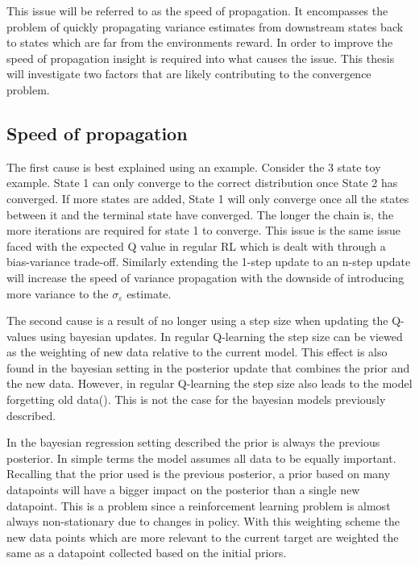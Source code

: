 This issue will be referred to as the speed of propagation. It encompasses the problem of quickly propagating variance estimates from downstream states back to states which are far from the environments reward. In order to improve the speed of propagation insight is required into what causes the issue. This thesis will investigate two factors that are likely contributing to the convergence problem.

\subsection{Speed of propagation}

The first cause is best explained using an example. Consider the 3 state toy example. State 1 can only converge to the correct distribution once State 2 has converged. If more states are added, State 1 will only converge once all the states between it and the terminal state have converged. The longer the chain is, the more iterations are required for state 1 to converge. This issue is the same issue faced with the expected Q value in regular RL which is dealt with through a bias-variance trade-off. Similarly extending the 1-step update to an n-step update will increase the speed of variance propagation with the downside of introducing more variance to the $\sigma_\varepsilon$ estimate.

The second cause is a result of no longer using a step size when updating the Q-values using bayesian updates. In regular Q-learning the step size can be viewed as the weighting of new data relative to the current model. This effect is also found in the bayesian setting in the posterior update that combines the prior and the new data. However, in regular Q-learning the step size also leads to the model forgetting old data(\citep[p~.229]{sutton_barto_2018}). This is not the case for the bayesian models previously described.

In the bayesian regression setting described the prior is always the previous posterior. In simple terms the model assumes all data to be equally important. Recalling that the prior used is the previous posterior, a prior based on many datapoints will have a bigger impact on the posterior than a single new datapoint. This is a problem since a reinforcement learning problem is almost always non-stationary due to changes in policy. With this weighting scheme the new data points which are more relevant to the current target are weighted the same as a datapoint collected based on the initial priors.

